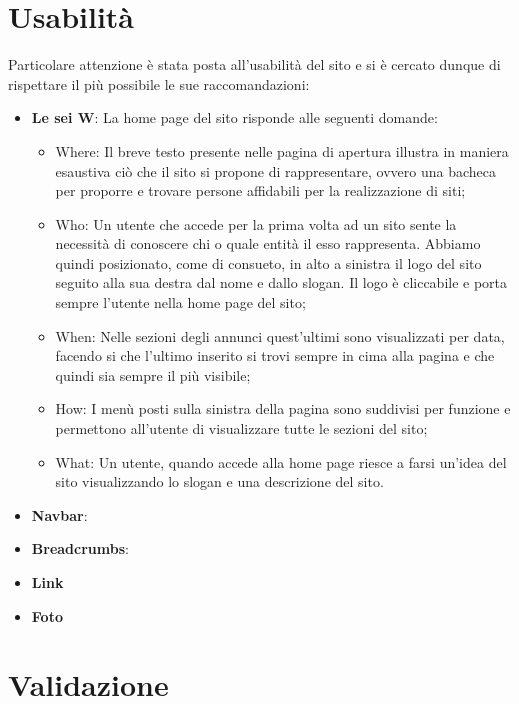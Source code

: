\documentclass[12pt]{article}
\begin{document}
\section{Usabilità}
Particolare attenzione è stata posta all’usabilità del sito e si è cercato dunque di rispettare il più possibile le sue raccomandazioni:

\begin{itemize}
\item \textbf{Le sei W}: La home page del sito risponde alle seguenti domande:

\begin{itemize}
\item Where: Il breve testo presente nelle pagina di apertura illustra in maniera esaustiva ciò che il sito si propone di rappresentare, ovvero una bacheca per proporre e trovare persone affidabili per la realizzazione di siti;
\item Who: Un utente che accede per la prima volta ad un sito sente la necessità di conoscere chi o quale entità il esso rappresenta. Abbiamo quindi posizionato, come di consueto, in alto a sinistra il logo del sito seguito alla sua destra dal nome e dallo slogan. Il logo è cliccabile e porta sempre l'utente nella home page del sito;
\item When: Nelle sezioni degli annunci quest'ultimi sono visualizzati per data, facendo si che l'ultimo inserito si trovi sempre in cima alla pagina e che quindi sia sempre il più visibile;
\item How: I menù posti sulla sinistra della pagina sono suddivisi per funzione e permettono all'utente di visualizzare tutte le sezioni del sito;
\item What: Un utente, quando accede alla home page riesce a farsi un’idea del sito visualizzando lo slogan e una descrizione del sito.
\end{itemize}

\item \textbf{Navbar}:

\item \textbf{Breadcrumbs}:

\item \textbf{Link}

\item \textbf{Foto}


\end{itemize}

		
\section{Validazione}
\end{document}
